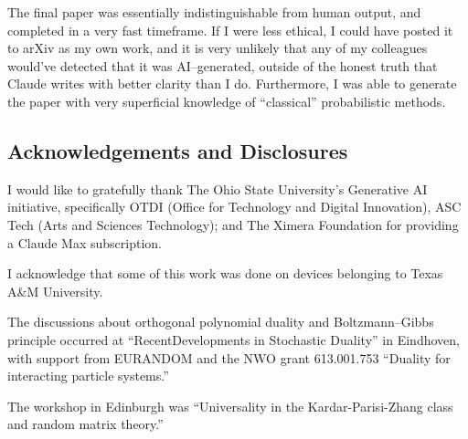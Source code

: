 \documentclass{article}
\begin{document}
The final paper was essentially indistinguishable from human output, and completed in a very fast timeframe. If I were less ethical, I could have posted it to arXiv as my own work, and it is very unlikely that any of my colleagues would've detected that it was AI--generated, outside of the honest truth that Claude writes with better clarity than I do. Furthermore, I was able to generate the paper with very superficial knowledge of ``classical'' probabilistic methods. 

\subsection{Acknowledgements and Disclosures}


I would like to gratefully thank The Ohio State University’s Generative AI initiative, specifically OTDI (Office for Technology and Digital Innovation), ASC Tech (Arts and Sciences Technology); and  The Ximera Foundation for providing a Claude Max subscription.

I acknowledge that some of this work was done on devices belonging to Texas A\&M University.

The discussions about orthogonal polynomial duality and Boltzmann--Gibbs principle occurred at “RecentDevelopments in Stochastic Duality” in Eindhoven, with support from EURANDOM and the NWO grant 613.001.753 “Duality for interacting particle systems.” 

The workshop in Edinburgh was ``Universality in the Kardar-Parisi­-Zhang class and random matrix theory.''
\end{document}
